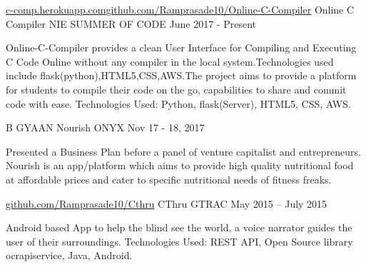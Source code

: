 \begin{cventries}
  \cventry
    {\href{https://c-comp.herokuapp.com}{c-comp.herokuapp.com}\quad\textbar\quad \href{https://github.com/Ramprasade10/Online-C-Compiler}{github.com/Ramprasade10/Online-C-Compiler}}
    {Online C Compiler} %
    {NIE SUMMER OF CODE} %
    {June 2017 - Present} %
    {
      \begin{cvitems} %
        \item {Online-C-Compiler provides a clean User Interface for Compiling and Executing C Code Online without any compiler in the local system.Technologies used include flask(python),HTML5,CSS,AWS.The project aims to provide a platform for students to compile their code on the go, capabilities to share and commit code with ease.\newline{}
Technologies Used: Python, flask(Server), HTML5, CSS, AWS.}
      \end{cvitems}
    }

  \cventry
    {B GYAAN} %
    {Nourish} %
    {ONYX} %
    {Nov 17 - 18, 2017} %
    {
      \begin{cvitems} %
        \item {Presented a Business Plan before a panel of venture capitalist and entrepreneurs.
Nourish is an app/platform which aims to provide high quality nutritional food at affordable prices and cater to specific nutritional needs of fitness freaks.}
      \end{cvitems}
    }
  \cventry
    {\href{https://github.com/Ramprasade10/Cthru}{github.com/Ramprasade10/Cthru}} %
    {CThru} %
    {GTRAC} %
    {May 2015 – July 2015} %
    {
      \begin{cvitems} %
        \item {Android based App to help the blind see the world, a voice narrator guides the user of their surroundings.\newline{}
Technologies Used: REST API, Open Source library ocrapiservice, Java, Android.}
      \end{cvitems}
    }


\end{cventries}
